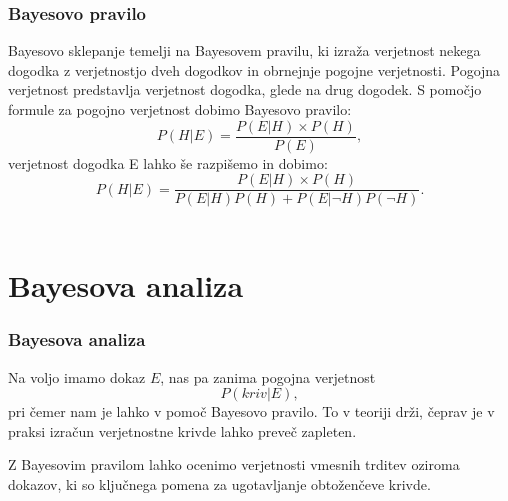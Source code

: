 \documentclass{beamer}
\begin{document}
\begin{frame}
  \frametitle{Bayesovo pravilo}
Bayesovo sklepanje temelji na Bayesovem pravilu, ki izraža verjetnost nekega dogodka z verjetnostjo dveh dogodkov in obrnejnje pogojne
verjetnosti. Pogojna verjetnost predstavlja verjetnost dogodka, glede na drug dogodek. \vspace{3mm}
S pomočjo formule za pogojno verjetnost dobimo Bayesovo pravilo:
\begin{equation}\label{eq:bpravilo}
    P(H \lvert E) = \frac{P(E \lvert H) \times P(H)}{P(E)},
\end{equation}
verjetnost dogodka E lahko še razpišemo in dobimo:
\begin{equation}\label{eq:b_pravilo}
  P(H \lvert E) = \frac{P(E \lvert H) \times P(H)}{P(E \lvert H)P(H) + P(E \lvert \neg H)P(\neg H)}.
\end{equation} \\
\end{frame}

\section{Bayesova analiza}

\begin{frame}
  \frametitle{Bayesova analiza}
Na voljo imamo dokaz $E$, nas pa zanima pogojna verjetnost
\begin{equation}
  P(kriv \lvert E),
\end{equation}
pri čemer nam je lahko v pomoč Bayesovo pravilo. To v teoriji drži, čeprav je v praksi izračun verjetnostne krivde lahko
preveč zapleten. \vspace{3mm}

Z Bayesovim pravilom lahko ocenimo verjetnosti vmesnih trditev oziroma dokazov, ki so ključnega pomena za ugotavljanje
obtoženčeve krivde.
\end{frame}
\end{document}
